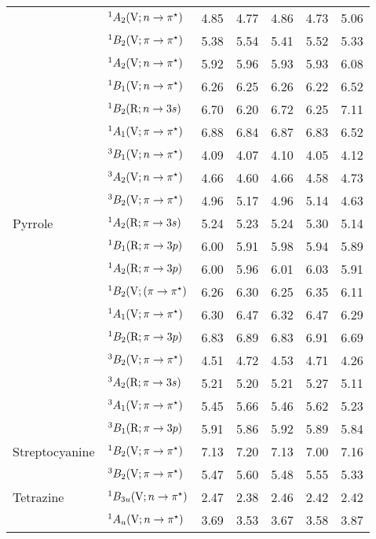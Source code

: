 \begin{tabular}{p{3.5cm}p{3.3cm}c|cccc}
        &$^1A_2 (\mathrm{V}; n \rightarrow \pi^\star)$					& 4.85	&4.77	&4.86	&4.73	&5.06 \\	
        &$^1B_2 (\mathrm{V}; \pi \rightarrow \pi^\star)$				& 5.38	&5.54	&5.41	&5.52	&5.33 \\	
        &$^1A_2 (\mathrm{V}; n \rightarrow \pi^\star)$					& 5.92	&5.96	&5.93	&5.93	&6.08 \\	
        &$^1B_1 (\mathrm{V}; n \rightarrow \pi^\star)$					& 6.26	&6.25	&6.26	&6.22	&6.52 \\	
        &$^1B_2  (\mathrm{R}; n \rightarrow 3s)$				& 6.70	&6.20	&6.72	&6.25	&7.11 \\	
        &$^1A_1 (\mathrm{V}; \pi \rightarrow \pi^\star)$				& 6.88	&6.84	&6.87	&6.83	&6.52 \\	
        &$^3B_1 (\mathrm{V}; n \rightarrow \pi^\star)$					& 4.09	&4.07	&4.10	&4.05	&4.12 \\	
        &$^3A_2 (\mathrm{V}; n \rightarrow \pi^\star)$					& 4.66	&4.60	&4.66	&4.58	&4.73 \\	
        &$^3B_2 (\mathrm{V}; \pi \rightarrow \pi^\star)$				& 4.96	&5.17	&4.96	&5.14	&4.63 \\	
   Pyrrole		&$^1A_2 (\mathrm{R}; \pi \rightarrow 3s)$				& 5.24	&5.23	&5.24	&5.30	&5.14 \\	
        &$^1B_1 (\mathrm{R}; \pi \rightarrow 3p)$				& 6.00 	&5.91	&5.98	&5.94	&5.89 \\	
        &$^1A_2 (\mathrm{R}; \pi \rightarrow 3p)$				& 6.00	&5.96	&6.01	&6.03	&5.91 \\	
        &$^1B_2 (\mathrm{V}; (\pi \rightarrow \pi^\star)$				& 6.26 	&6.30	&6.25	&6.35	&6.11 \\	
        &$^1A_1 (\mathrm{V}; \pi \rightarrow \pi^\star)$				& 6.30 	&6.47	&6.32	&6.47	&6.29 \\	
        &$^1B_2 (\mathrm{R}; \pi \rightarrow 3p)$				& 6.83	&6.89	&6.83	&6.91	&6.69 \\	
        &$^3B_2 (\mathrm{V}; \pi \rightarrow \pi^\star)$				& 4.51	&4.72	&4.53	&4.71	&4.26 \\	
        &$^3A_2 (\mathrm{R}; \pi \rightarrow 3s)$				& 5.21	&5.20	&5.21	&5.27	&5.11 \\	
        &$^3A_1 (\mathrm{V}; \pi \rightarrow \pi^\star)$				& 5.45	&5.66	&5.46	&5.62	&5.23 \\	
        &$^3B_1 (\mathrm{R}; \pi \rightarrow 3p)$				& 5.91	&5.86	&5.92	&5.89	&5.84 \\	
  Streptocyanine &$^1B_2 (\mathrm{V};\pi \rightarrow \pi^\star)$ 				&7.13	&7.20	&7.13	&7.00	&7.16	\\
        &$^3B_2 (\mathrm{V};\pi \rightarrow \pi^\star)$ 				& 5.47	&5.60	&5.48	&5.55	&5.33	\\
  Tetrazine		&$^1B_{3u}  (\mathrm{V}; n \rightarrow \pi^\star)$				& 2.47	&2.38	&2.46	&2.42	&2.42 \\	
        &$^1A_u    (\mathrm{V}; n \rightarrow \pi^\star)$				& 3.69	&3.53	&3.67	&3.58	&3.87 \\	

\end{tabular}
